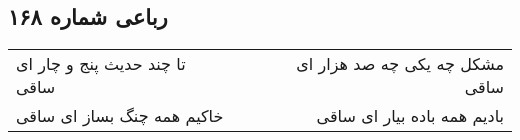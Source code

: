 \begin{center}
\section*{رباعی شماره ۱۶۸}
\label{sec:sh168}
\begin{longtable}{l p{0.5cm} r}
تا چند حدیث پنج و چار ای ساقی
&&
مشکل چه یکی چه صد هزار ای ساقی
\\
خاکیم همه چنگ بساز ای ساقی
&&
بادیم همه باده بیار ای ساقی
\\
\end{longtable}
\end{center}
